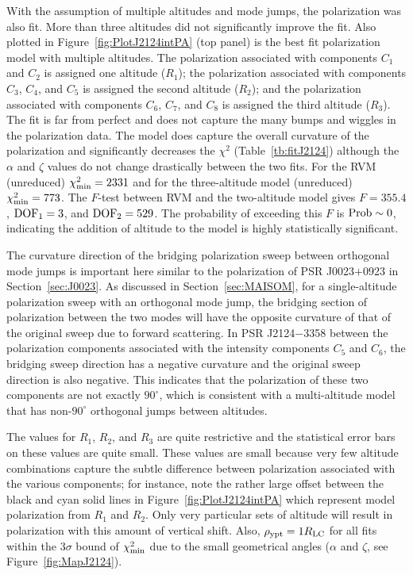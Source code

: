 With the assumption of multiple altitudes and mode jumps, the polarization was also fit.
More than three altitudes did not significantly improve the fit.  
Also plotted in Figure~\ref{fig:PlotJ2124intPA} (top panel) 
is the best fit polarization model with multiple 
altitudes.  The polarization associated with components $C_1$ and $C_2$ is assigned one 
altitude ($R_1$); the polarization associated with components $C_3$, $C_4$, and $C_5$ is assigned the second
altitude ($R_2$); and the polarization associated with components 
$C_6$, $C_7$, and $C_8$ is assigned the third altitude ($R_3$).
The fit is far from perfect and does not capture the many bumps 
and wiggles in the polarization data.  The model does capture the overall
curvature of the polarization and significantly decreases the $\chi^2$ (Table~\ref{tb:fitJ2124})
although the $\alpha$ and $\zeta$ values do not change drastically between the two fits.
For the RVM (unreduced) $\chi^2_{\rm{min}}=2331$ and 
for the three-altitude model (unreduced) $\chi^2_{\rm{min}}=773$.
The $F$-test between RVM and the two-altitude model gives $F=355.4$, 
$\rm{DOF}_1=3$, and $\rm{DOF}_2=529$. The probability of
exceeding this $F$ is $\rm{Prob}\sim 0$, indicating the addition of altitude to the model
is highly statistically significant.

The curvature direction of the bridging polarization sweep between orthogonal
mode jumps is important here similar to the 
polarization of PSR J0023$+$0923 in Section~\ref{sec:J0023}.
As discussed in Section~\ref{sec:MAISOM}, for a single-altitude polarization sweep
with an orthogonal mode jump, the bridging section of 
polarization between the two modes will have
the opposite curvature of that of the 
original sweep due to forward scattering.  In PSR J2124$-$3358
between the polarization components associated with the intensity components $C_5$ and $C_6$, 
the bridging sweep direction has a negative curvature and the original sweep direction
is also negative.  This indicates that the polarization of these two components are not exactly
$90^\circ$, which is consistent with a 
multi-altitude model that has non-$90^\circ$ orthogonal jumps
between altitudes.

The values for $R_1$, $R_2$, and $R_3$ are quite restrictive and the statistical error
bars on these values are quite small.  These values are small because very
few altitude combinations capture the subtle difference between polarization
associated with the various components; for instance, note the rather large
offset between the black and cyan solid lines in Figure~\ref{fig:PlotJ2124intPA}
which represent model polarization from $R_{1}$ and $R_{2}$.  Only very 
particular sets of altitude will result in polarization with this amount
of vertical shift.
Also, $\rho_{\rm{ypt}}=1 R_{\rm{LC}}$ for all fits within
the $3\sigma$ bound of $\chi^2_{\rm{min}}$ due to the small geometrical angles 
($\alpha$ and $\zeta$, see Figure~\ref{fig:MapJ2124}).



